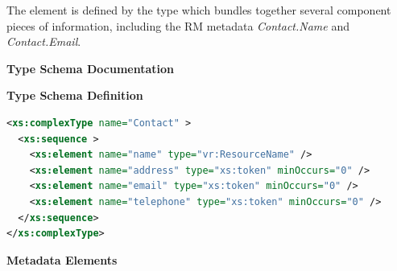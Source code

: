 \documentclass[11pt,a4paper]{ivoa}
\begin{document}
\endgroup



The  element is defined by the
 type which bundles together several component
pieces of information, including the RM metadata \emph{Contact.Name}
and \emph{Contact.Email}.  



\begingroup
      	\renewcommand*\descriptionlabel[1]{%
      	\hbox to 5.5em{\emph{#1}\hfil}}\vspace{2ex}\noindent\textbf{ Type Schema Documentation}


\vspace{1ex}\noindent\textbf{ Type Schema Definition}

\begin{lstlisting}[language=XML,basicstyle=\footnotesize]
<xs:complexType name="Contact" >
  <xs:sequence >
    <xs:element name="name" type="vr:ResourceName" />
    <xs:element name="address" type="xs:token" minOccurs="0" />
    <xs:element name="email" type="xs:token" minOccurs="0" />
    <xs:element name="telephone" type="xs:token" minOccurs="0" />
  </xs:sequence>
</xs:complexType>
\end{lstlisting}

\vspace{0.5ex}\noindent\textbf{ Metadata Elements}
\end{document}
